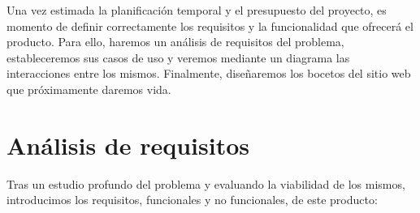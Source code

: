 Una vez estimada la planificación temporal y el presupuesto del proyecto, es momento de definir correctamente los requisitos y la funcionalidad que ofrecerá el producto. Para ello, haremos un análisis de requisitos del problema, estableceremos sus casos de uso y veremos mediante un diagrama las interacciones entre los mismos. Finalmente, diseñaremos los bocetos del sitio web que próximamente daremos vida.

\section*{Análisis de requisitos}

Tras un estudio profundo del problema y evaluando la viabilidad de los mismos, introducimos los requisitos, funcionales y no funcionales, de este producto:

